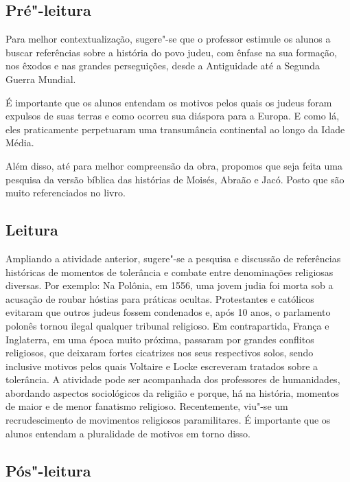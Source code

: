 \documentclass[12pt]{extarticle}
\begin{document}

\subsection{Pré"-leitura}
Para melhor contextualização, sugere"-se que o professor
estimule os alunos a buscar referências sobre a história do povo judeu,
com ênfase na sua formação, nos êxodos e nas grandes perseguições, desde
a Antiguidade até a Segunda Guerra Mundial.

É importante que os alunos entendam os motivos pelos quais os judeus
foram expulsos de suas terras e como ocorreu sua diáspora para a Europa.
E como lá, eles praticamente perpetuaram uma transumância continental ao
longo da Idade Média.

Além disso, até para melhor compreensão da obra, propomos que seja feita
uma pesquisa da versão bíblica das histórias de Moisés, Abraão e Jacó.
Posto que são muito referenciados no livro.

\subsection{Leitura}

Ampliando a atividade anterior, sugere"-se a pesquisa e
discussão de referências históricas de momentos de tolerância e combate
entre denominações religiosas diversas. Por exemplo: Na Polônia, em
1556, uma jovem judia foi morta sob a acusação de roubar hóstias para
práticas ocultas. Protestantes e católicos evitaram que outros judeus
fossem condenados e, após 10 anos, o parlamento polonês tornou ilegal
qualquer tribunal religioso. Em contrapartida, França e Inglaterra, em
uma época muito próxima, passaram por grandes conflitos religiosos, que
deixaram fortes cicatrizes nos seus respectivos solos, sendo inclusive
motivos pelos quais Voltaire e Locke escreveram tratados sobre a
tolerância. A atividade pode ser acompanhada dos professores de
humanidades, abordando aspectos sociológicos da religião e porque, há na
história, momentos de maior e de menor fanatismo religioso.
Recentemente, viu"-se um recrudescimento de movimentos religiosos
paramilitares. É importante que os alunos entendam a pluralidade de
motivos em torno disso.

\subsection{Pós"-leitura}
\end{document}
